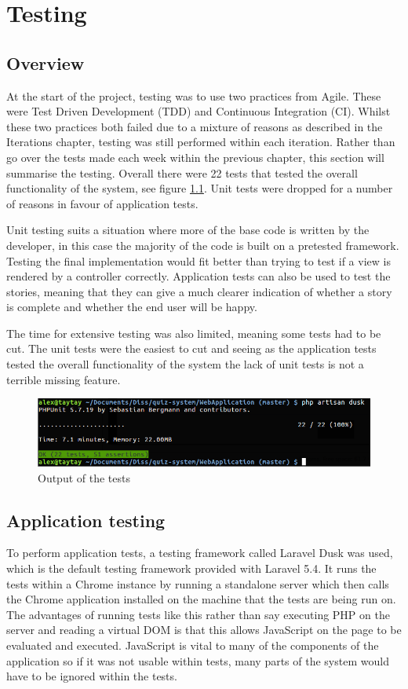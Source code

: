 \chapter{Testing}

\section{Overview}
At the start of the project, testing was to use two practices from Agile. These were Test Driven Development (TDD) and Continuous Integration (CI). Whilst these two practices both failed due to a mixture of reasons as described in the Iterations chapter, testing was still performed within each iteration. Rather than go over the tests made each week within the previous chapter, this section will summarise the testing. Overall there were 22 tests that tested the overall functionality of the system, see figure \ref{fig:test-output}. Unit tests were dropped for a number of reasons in favour of application tests.

Unit testing suits a situation where more of the base code is written by the developer, in this case the majority of the code is built on a pretested framework. Testing the final implementation would fit better than trying to test if a view is rendered by a controller correctly. Application tests can also be used to test the stories, meaning that they can give a much clearer indication of whether a story is complete and whether the end user will be happy. 

The time for extensive testing was also limited, meaning some tests had to be cut. The unit tests were the easiest to cut and seeing as the application tests tested the overall functionality of the system the lack of unit tests is not a terrible missing feature. 

\begin{figure}
	\caption{Output of the tests}
	\centerline{\includegraphics[scale=0.8]{Chapter4/test-output}}
	\label{fig:test-output}
\end{figure}

\section{Application testing}
To perform application tests, a testing framework called Laravel Dusk was used, which is the default testing framework provided with Laravel 5.4\cite{dusk}\cite{dusk-desc}. It runs the tests within a Chrome instance by running a standalone server which then calls the Chrome application installed on the machine that the tests are being run on. The advantages of running tests like this rather than say executing PHP on the server and reading a virtual DOM is that this allows JavaScript on the page to be evaluated and executed. JavaScript is vital to many of the components of the application so if it was not usable within tests, many parts of the system would have to be ignored within the tests.

